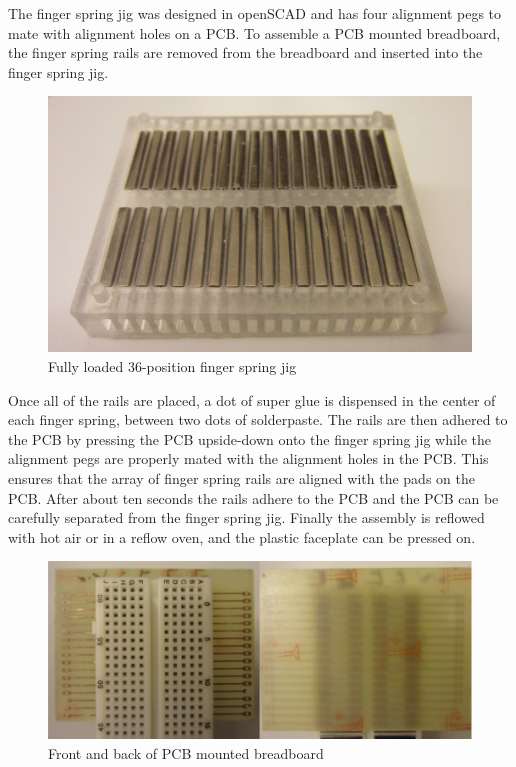\documentclass[11pt,twoside]{mitthesis}
\begin{document}
The finger spring jig was designed in openSCAD and has four alignment pegs to mate with alignment holes on a PCB.
To assemble a PCB mounted breadboard, the finger spring rails are removed from the breadboard and inserted into the finger spring jig.
\begin{figure}[H]
  \begin{center}
      \includegraphics[width=.8\textwidth]{../bb-w-rails.png}
      \caption{Fully loaded 36-position finger spring jig}
  \end{center}
\end{figure}
Once all of the rails are placed, a dot of super glue is dispensed in the center of each finger spring, between two dots of solderpaste.
The rails are then adhered to the PCB by pressing the PCB upside-down onto the finger spring jig while the alignment pegs are properly mated with the alignment holes in the PCB.
This ensures that the array of finger spring rails are aligned with the pads on the PCB.
After about ten seconds the rails adhere to the PCB and the PCB can be carefully separated from the finger spring jig.
Finally the assembly is reflowed with hot air or in a reflow oven, and the plastic faceplate can be pressed on.
\begin{figure}[H]
  \begin{center}
      \includegraphics[width=.8\textwidth]{../bb-mount.png}
      \caption{Front and back of PCB mounted breadboard}
  \end{center}
\end{figure}
\end{document}
